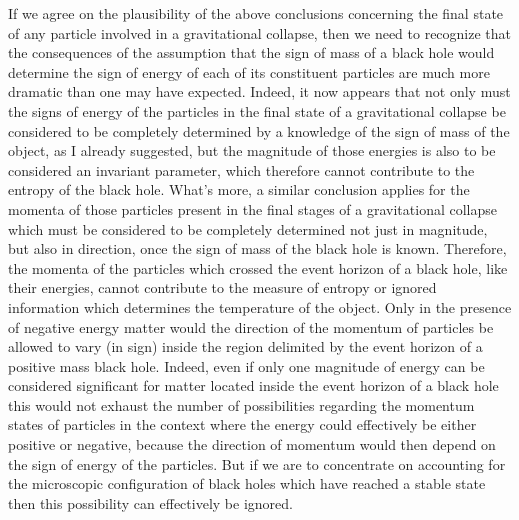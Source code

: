 \documentclass[notitlepage,12pt]{report}
\begin{document}
If we agree on the plausibility of the above conclusions concerning the final state of any particle involved in a gravitational collapse, then we need to recognize that the consequences of the assumption that the sign of mass of a black hole would determine the sign of energy of each of its constituent particles are much more dramatic than one may have expected. Indeed, it now appears that not only must the signs of energy of the particles in the final state of a gravitational collapse be considered to be completely determined by a knowledge of the sign of mass of the object, as I already suggested, but the magnitude of those energies is also to be considered an invariant parameter, which therefore cannot contribute to the entropy of the black hole. What's more, a similar conclusion applies for the momenta of those particles present in the final stages of a gravitational collapse which must be considered to be completely determined not just in magnitude, but also in direction, once the sign of mass of the black hole is known. Therefore, the momenta of the particles which crossed the event horizon of a black hole, like their energies, cannot contribute to the measure of entropy or ignored information which determines the temperature of the object. Only in the presence of negative energy matter would the direction of the momentum of particles be allowed to vary (in sign) inside the region delimited by the event horizon of a positive mass black hole. Indeed, even if only one magnitude of energy can be considered significant for matter located inside the event horizon of a black hole this would not exhaust the number of possibilities regarding the momentum states of particles in the context where the energy could effectively be either positive or negative, because the direction of momentum would then depend on the sign of energy of the particles. But if we are to concentrate on accounting for the microscopic configuration of black holes which have reached a stable state then this possibility can effectively be ignored.
\end{document}
